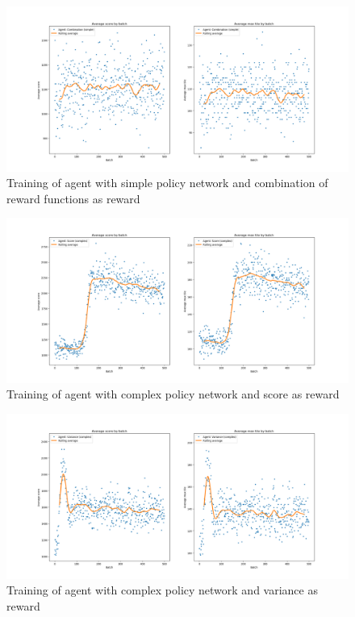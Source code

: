 \documentclass[11pt, fleqn]{article}
\begin{document}
\begin{figure}[H]
	\centering
	\includegraphics[width=\linewidth]{"train_combination_simple"}
	\caption{Training of agent with simple policy network and combination of reward functions as reward}
\end{figure}


\begin{figure}[H]
	\centering
	\includegraphics[width=\linewidth]{"train_score_complex"}
	\caption{Training of agent with complex policy network and score as reward}
\end{figure}
\begin{figure}[H]
	\centering
	\includegraphics[width=\linewidth]{"train_variance_complex"}
	\caption{Training of agent with complex policy network and variance as reward}
\end{figure}
\end{document}
